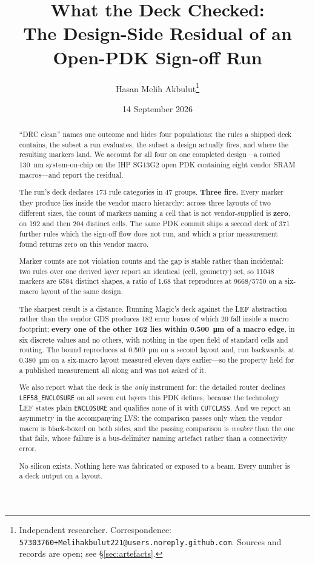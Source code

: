 \documentclass[11pt,a4paper]{article}
\title{What the Deck Checked:\\
The Design-Side Residual of an Open-PDK Sign-off Run}
\author{Hasan Melih Akbulut\thanks{Independent researcher.
Correspondence: \texttt{57303760+Melihakbulut221@users.noreply.github.com}.
Sources and records are open; see \S\ref{sec:artefacts}.}}
\date{14 September 2026}
\begin{document}
\maketitle

\begin{abstract}
``DRC clean'' names one outcome and hides four populations: the rules a
shipped deck contains, the subset a run evaluates, the subset a design
actually fires, and where the resulting markers land. We account for all
four on one completed design---a routed \SI{130}{\nano\meter}
system-on-chip on the IHP SG13G2 open PDK containing eight vendor SRAM
macros---and report the residual.

The run's deck declares \num{173} rule categories in 47 groups. \textbf{Three
fire.} Every marker they produce lies inside the vendor macro hierarchy:
across three layouts of two different sizes, the count of markers naming
a cell that is not vendor-supplied is \textbf{zero}, on \num{192} and then
\num{204} distinct cells. The same PDK commit ships a second deck of
\num{371} further rules which the sign-off flow does not run, and which a
prior measurement found returns zero on this vendor macro.

Marker counts are not violation counts and the gap is stable rather than
incidental: two rules over one derived layer report an identical
(cell, geometry) set, so \num{11048} markers are \num{6584} distinct
shapes, a ratio of \num{1.68} that reproduces at \num{9668}/\num{5750}
on a six-macro layout of the same design.

The sharpest result is a distance. Running Magic's deck against the
LEF abstraction rather than the vendor GDS produces \num{182} error boxes
of which \num{20} fall inside a macro footprint; \textbf{every one of the
other \num{162} lies within \SI{0.500}{\micro\meter} of a macro edge}, in
six discrete values and no others, with nothing in the open field of
standard cells and routing. The bound reproduces at
\SI{0.500}{\micro\meter} on a second layout and, run backwards, at
\SI{0.380}{\micro\meter} on a six-macro layout measured eleven days
earlier---so the property held for a published measurement all along and
was not asked of it.

We also report what the deck is the \emph{only} instrument for: the
detailed router declines \texttt{LEF58\_ENCLOSURE} on all seven cut
layers this PDK defines, because the technology LEF states plain
\texttt{ENCLOSURE} and qualifies none of it with \texttt{CUTCLASS}. And
we report an asymmetry in the accompanying LVS: the comparison passes
only when the vendor macro is black-boxed on both sides, and the passing
comparison is \emph{weaker} than the one that fails, whose failure is a
bus-delimiter naming artefact rather than a connectivity error.

No silicon exists. Nothing here was fabricated or exposed to a beam.
Every number is a deck output on a layout.
\end{abstract}
\end{document}
